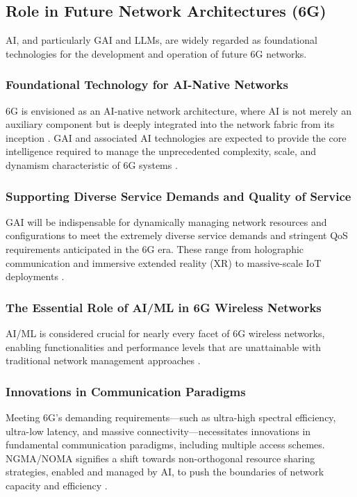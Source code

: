 \documentclass[sigconf]{acmart}
\begin{document}
\subsection{Role in Future Network Architectures (6G)}
\label{subsec:6g}

AI, and particularly GAI and LLMs, are widely regarded as foundational technologies for the development and operation of future 6G networks.

\subsubsection{Foundational Technology for AI-Native Networks}\label{subsubsec:6g_ainative}
6G is envisioned as an AI-native network architecture, where AI is not merely an auxiliary component but is deeply integrated into the network fabric from its inception \cite{ref7, ref9}. GAI and associated AI technologies are expected to provide the core intelligence required to manage the unprecedented complexity, scale, and dynamism characteristic of 6G systems \cite{ref7, ref9}.

\subsubsection{Supporting Diverse Service Demands and Quality of Service}\label{subsubsec:6g_qos}
GAI will be indispensable for dynamically managing network resources and configurations to meet the extremely diverse service demands and stringent QoS requirements anticipated in the 6G era. These range from holographic communication and immersive extended reality (XR) to massive-scale IoT deployments \cite{ref9}.

\subsubsection{The Essential Role of AI/ML in 6G Wireless Networks} \label{subsubsec:6g_essential}
AI/ML is considered crucial for nearly every facet of 6G wireless networks, enabling functionalities and performance levels that are unattainable with traditional network management approaches \cite{ref13}.

\subsubsection{Innovations in Communication Paradigms} \label{subsubsec:6g_paradigms}
Meeting 6G's demanding requirements—such as ultra-high spectral efficiency, ultra-low latency, and massive connectivity—necessitates innovations in fundamental communication paradigms, including multiple access schemes. NGMA/NOMA signifies a shift towards non-orthogonal resource sharing strategies, enabled and managed by AI, to push the boundaries of network capacity and efficiency \cite{ref30}.
\end{document}
